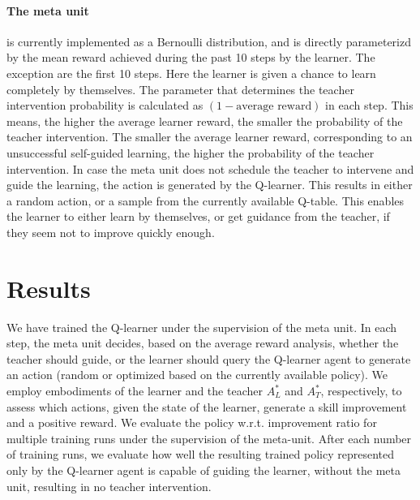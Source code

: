 \documentclass{article}
\begin{document}
    \paragraph{The \textbf{meta unit}} is currently implemented as a Bernoulli distribution, and is directly parameterizd by the mean reward achieved during the past 10 steps by the learner. The exception are the first 10 steps. Here the learner is given a chance to learn completely by themselves.  The parameter that determines the teacher intervention probability is calculated as $(1 - \textrm{average reward})$ in each step. This means, the higher the average learner reward, the smaller the probability of the teacher intervention.  The smaller the average learner reward, corresponding to an unsuccessful self-guided learning, the higher the probability of the teacher intervention. In case the meta unit does not schedule the  teacher to intervene and   guide the learning, the action is generated by the Q-learner. This results in either a random action, or  a sample from the currently available Q-table.  This enables the learner to either learn by themselves, or get guidance from the teacher, if they seem not to improve quickly enough.


\section{Results}
We have trained the Q-learner under the supervision of the  meta unit. In each step, the meta unit decides, based on the average reward analysis, whether the teacher should guide, or the learner should query the Q-learner agent to generate an action (random or optimized based on the currently available policy). 
We employ embodiments of the learner and  the teacher  $A^*_L$ and $A^*_T$, respectively, to assess which actions, given the state of the learner, generate a skill improvement and a positive reward. We    evaluate the policy w.r.t. improvement ratio for multiple  training runs under the supervision of the meta-unit. After each number of training runs, we evaluate how well  the resulting trained policy represented only by the Q-learner agent is capable of guiding the learner, without the meta unit, resulting in no teacher intervention.      
\end{document}
